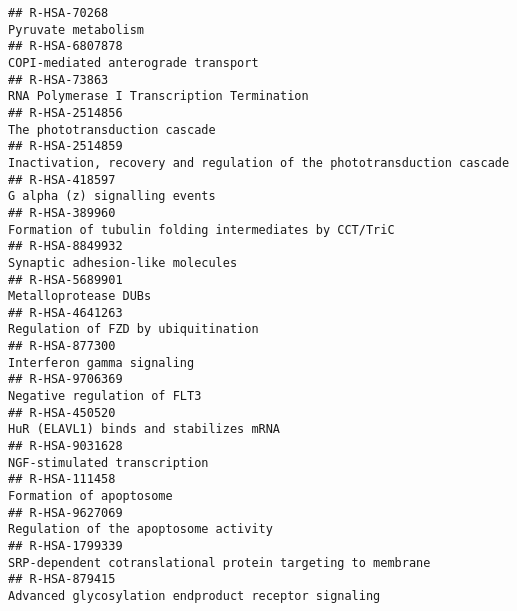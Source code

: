 \documentclass[
]{article}
\begin{document}
\begin{verbatim}
## R-HSA-70268                                                                                                                    Pyruvate metabolism
## R-HSA-6807878                                                                                                  COPI-mediated anterograde transport
## R-HSA-73863                                                                                             RNA Polymerase I Transcription Termination
## R-HSA-2514856                                                                                                        The phototransduction cascade
## R-HSA-2514859                                                               Inactivation, recovery and regulation of the phototransduction cascade
## R-HSA-418597                                                                                                         G alpha (z) signalling events
## R-HSA-389960                                                                                Formation of tubulin folding intermediates by CCT/TriC
## R-HSA-8849932                                                                                                     Synaptic adhesion-like molecules
## R-HSA-5689901                                                                                                                 Metalloprotease DUBs
## R-HSA-4641263                                                                                                  Regulation of FZD by ubiquitination
## R-HSA-877300                                                                                                            Interferon gamma signaling
## R-HSA-9706369                                                                                                          Negative regulation of FLT3
## R-HSA-450520                                                                                                HuR (ELAVL1) binds and stabilizes mRNA
## R-HSA-9031628                                                                                                         NGF-stimulated transcription
## R-HSA-111458                                                                                                               Formation of apoptosome
## R-HSA-9627069                                                                                                Regulation of the apoptosome activity
## R-HSA-1799339                                                                          SRP-dependent cotranslational protein targeting to membrane
## R-HSA-879415                                                                                  Advanced glycosylation endproduct receptor signaling

\end{verbatim}
\end{document}
